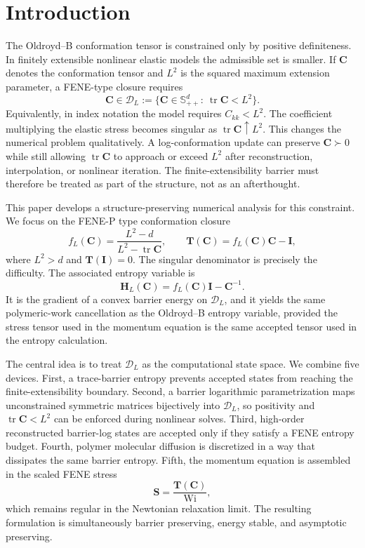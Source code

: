 ﻿\documentclass[11pt]{amsart}
\newcommand{\CC}{\bm C}
\newcommand{\HH}{\bm H}
\newcommand{\Id}{\bm I}
\newcommand{\SSS}{\bm S}
\newcommand{\TT}{\bm T}
\newcommand{\Wi}{\mathrm{Wi}}
\newcommand{\calD}{\mathcal D}
\newcommand{\tr}{\operatorname{tr}}
\begin{document}
\section{Introduction}

The Oldroyd--B conformation tensor is constrained only by positive definiteness.  In finitely extensible nonlinear elastic models the admissible set is smaller.  If $\CC$ denotes the conformation tensor and $L^2$ is the squared maximum extension parameter, a FENE-type closure requires
\[
  \CC\in \calD_L:=\{\CC\in\mathbb S_{++}^d:\ \tr\CC<L^2\}.
\]
Equivalently, in index notation the model requires $C_{kk}<L^2$.  The coefficient multiplying the elastic stress becomes singular as $\tr\CC\uparrow L^2$.  This changes the numerical problem qualitatively.  A log-conformation update can preserve $\CC\succ0$ while still allowing $\tr\CC$ to approach or exceed $L^2$ after reconstruction, interpolation, or nonlinear iteration.  The finite-extensibility barrier must therefore be treated as part of the structure, not as an afterthought.

This paper develops a structure-preserving numerical analysis for this constraint.  We focus on the FENE-P type conformation closure
\[
  f_L(\CC)=\frac{L^2-d}{L^2-\tr\CC},\qquad
  \TT(\CC)=f_L(\CC)\CC-\Id ,
\]
where $L^2>d$ and $\TT(\Id)=0$.  The singular denominator is precisely the difficulty.  The associated entropy variable is
\[
  \HH_L(\CC)=f_L(\CC)\Id-\CC^{-1}.
\]
It is the gradient of a convex barrier energy on $\calD_L$, and it yields the same polymeric-work cancellation as the Oldroyd--B entropy variable, provided the stress tensor used in the momentum equation is the same accepted tensor used in the entropy calculation.

The central idea is to treat $\calD_L$ as the computational state space.  We combine five devices.  First, a trace-barrier entropy prevents accepted states from reaching the finite-extensibility boundary.  Second, a barrier logarithmic parametrization maps unconstrained symmetric matrices bijectively into $\calD_L$, so positivity and $\tr\CC<L^2$ can be enforced during nonlinear solves.  Third, high-order reconstructed barrier-log states are accepted only if they satisfy a FENE entropy budget.  Fourth, polymer molecular diffusion is discretized in a way that dissipates the same barrier entropy.  Fifth, the momentum equation is assembled in the scaled FENE stress
\[
  \SSS=\frac{\TT(\CC)}{\Wi},
\]
which remains regular in the Newtonian relaxation limit.  The resulting formulation is simultaneously barrier preserving, energy stable, and asymptotic preserving.
\end{document}
